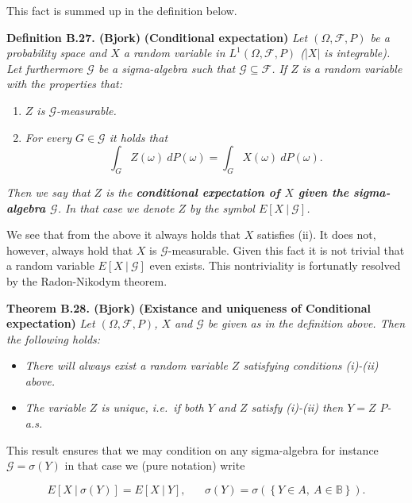 \documentclass[a4paper,12pt,openany]{book}
\providecommand{\tightlist}{%
 \setlength{\itemsep}{0pt}\setlength{\parskip}{0pt}}
\begin{document}
This fact is summed up in the definition below.

\textbf{Definition B.27. (Bjork)} \textbf{(Conditional expectation)} \emph{Let \((\Omega,\mathcal{F},P)\) be a probability space and \(X\) a random variable in \(L^1(\Omega,\mathcal{F},P)\) (\(\vert X\vert\) is integrable). Let furthermore \(\mathcal{G}\) be a sigma-algebra such that \(\mathcal{G}\subseteq \mathcal{F}\). If \(Z\) is a random variable with the properties that:}

\begin{enumerate}
\def\labelenumi{\roman{enumi}.}
\tightlist
\item
  \emph{\(Z\) is \(\mathcal{G}\)-measurable.}
\item
  \emph{For every \(G\in\mathcal{G}\) it holds that}
  \[\int_G Z(\omega)\ dP(\omega)=\int_G X(\omega)\ dP(\omega).\tag{B.5}\]
\end{enumerate}

\emph{Then we say that \(Z\) is the \textbf{conditional expectation of \(X\) given the sigma-algebra \(\mathcal{G}\)}. In that case we denote \(Z\) by the symbol \(E[X\ \vert\ \mathcal{G}]\).}

We see that from the above it always holds that \(X\) satisfies (ii). It does not, however, always hold that \(X\) is \(\mathcal{G}\)-measurable. Given this fact it is not trivial that a random variable \(E[X\ \vert\ \mathcal{G}]\) even exists. This nontriviality is fortunatly resolved by the Radon-Nikodym theorem.

\textbf{Theorem B.28. (Bjork)} \textbf{(Existance and uniqueness of Conditional expectation)} \emph{Let \((\Omega,\mathcal{F},P)\), \(X\) and \(\mathcal{G}\) be given as in the definition above. Then the following holds:}

\begin{itemize}
\tightlist
\item
  \emph{There will always exist a random variable \(Z\) satisfying conditions (i)-(ii) above.}
\item
  \emph{The variable \(Z\) is unique, i.e.~if both \(Y\) and \(Z\) satisfy (i)-(ii) then \(Y=Z\) \(P\)-a.s.}
\end{itemize}

This result ensures that we may condition on any sigma-algebra for instance \(\mathcal{G}=\sigma(Y)\) in that case we (pure notation) write

\[
E[X\ \vert\ \sigma(Y)]=E[X\ \vert\ Y],\hspace{20pt}\sigma(Y)=\sigma\left(\left\{ Y\in A,\ A\in\mathbb{B}\right\}\right).
\]
\end{document}
